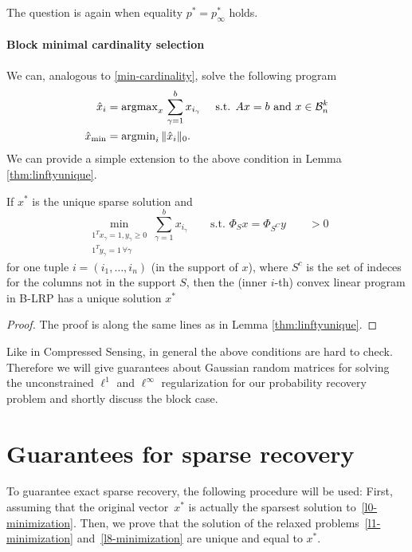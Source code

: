 \documentclass{article} %
\begin{document}
The question is again when equality $p^* = p^*_{\infty}$ holds. 

\paragraph{Block minimal cardinality selection}
We can, analogous to \eqref{min-cardinality}, solve the following program
\begin{align}
\hat{x}_i &=  \operatorname{argmax}\limits_{x}\, \sum_{\gamma=1}^b x_{i_\gamma} \quad \text{ s.t. } Ax = b \text{ and } x\in \mathcal B_n^k \label{block-min-cardinality}\\
\hat{x}_{\min} &= \operatorname{argmin}\limits_{i} \|\hat{x}_i\|_0. \nonumber
\end{align}
We can provide a simple extension to the above condition in Lemma \ref{thm:linftyunique}.
\begin{lemma} \label{thm:linftyunique_block}
If $x^*$ is the unique sparse solution and 
\begin{equation*}
\min_{\substack{1^Tx_{\gamma} = 1, y_{\gamma} \geq 0\\1^Ty_{\gamma} =1\, \forall \gamma}} \sum_{\gamma =1}^b x_{i_{\gamma}} \qquad \text{s.t. } \Phi_S x = \Phi_{S^C} y \qquad>0
\end{equation*}
for one tuple $i = (i_1, \dots, i_n)$ (in the support of $x$), where $S^c$ is the set of indeces for the columns not in the support $S$, then the (inner $i$-th) convex linear program in B-LRP has a unique solution $x^*$
\end{lemma}
\begin{proof}
The proof is along the same lines as in Lemma \ref{thm:linftyunique}.
\end{proof}

Like in Compressed Sensing, in general the above conditions are hard to check. Therefore we will give guarantees about Gaussian random matrices for solving the unconstrained $\ell^1$ and $\ell^\infty$ regularization for our probability recovery problem and shortly discuss the block case.

\section{Guarantees for sparse recovery}\label{sec:theory}
To guarantee exact sparse recovery, the following procedure will be used: First, assuming that the original vector~$x^*$ is actually the sparsest solution to~\eqref{l0-minimization}. Then, we prove that the solution of the relaxed problems~\eqref{l1-minimization} and~\eqref{l8-minimization} are unique and equal to $x^*$.
\end{document}
